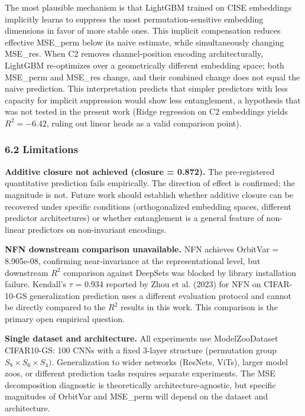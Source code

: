 The most plausible mechanism is that LightGBM trained on CISE embeddings implicitly learns to suppress the most permutation-sensitive embedding dimensions in favor of more stable ones. This implicit compensation reduces effective MSE\_perm below its naive estimate, while simultaneously changing MSE\_res. When C2 removes channel-position encoding architecturally, LightGBM re-optimizes over a geometrically different embedding space; both MSE\_perm and MSE\_res change, and their combined change does not equal the naive prediction. This interpretation predicts that simpler predictors with less capacity for implicit suppression would show less entanglement, a hypothesis that was not tested in the present work (Ridge regression on C2 embeddings yields $R^2 = -6.42$, ruling out linear heads as a valid comparison point).

\subsubsection{6.2 Limitations}

\textbf{Additive closure not achieved (closure = 0.872).} The pre-registered quantitative prediction fails empirically. The direction of effect is confirmed; the magnitude is not. Future work should establish whether additive closure can be recovered under specific conditions (orthogonalized embedding spaces, different predictor architectures) or whether entanglement is a general feature of non-linear predictors on non-invariant encodings.

\textbf{NFN downstream comparison unavailable.} NFN achieves OrbitVar = 8.905e-08, confirming near-invariance at the representational level, but downstream $R^2$ comparison against DeepSets was blocked by library installation failure. Kendall's $\tau$ = 0.934 reported by Zhou et al. (2023) for NFN on CIFAR-10-GS generalization prediction uses a different evaluation protocol and cannot be directly compared to the $R^2$ results in this work. This comparison is the primary open empirical question.

\textbf{Single dataset and architecture.} All experiments use ModelZooDataset CIFAR10-GS: 100 CNNs with a fixed 3-layer structure (permutation group $S_8 \times S_6 \times S_{4})$. Generalization to wider networks (ResNets, ViTs), larger model zoos, or different prediction tasks requires separate experiments. The MSE decomposition diagnostic is theoretically architecture-agnostic, but specific magnitudes of OrbitVar and MSE\_perm will depend on the dataset and architecture.

